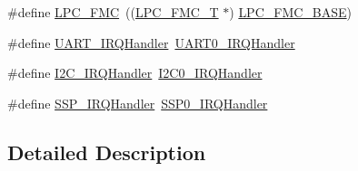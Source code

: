 \begin{DoxyCompactItemize}
\item 
\#define \hyperlink{group__PERIPH__175X__6X__BASE_ga406fa416fe50b196b86146ba0b20ba3c}{L\-P\-C\-\_\-\-F\-M\-C}~((\hyperlink{structLPC__FMC__T}{L\-P\-C\-\_\-\-F\-M\-C\-\_\-\-T}              $\ast$) \hyperlink{group__PERIPH__407X__8X__BASE_gaad6b7f57ab13bf5886da624bbb4bcc61}{L\-P\-C\-\_\-\-F\-M\-C\-\_\-\-B\-A\-S\-E})
\item 
\#define \hyperlink{group__PERIPH__175X__6X__BASE_gaf6a20f8c9320377f3713d96ea90bfd10}{U\-A\-R\-T\-\_\-\-I\-R\-Q\-Handler}~\hyperlink{lpc17__uartrb_8c_a1c0544b06d54b198d8c50f507e399a91}{U\-A\-R\-T0\-\_\-\-I\-R\-Q\-Handler}
\item 
\#define \hyperlink{group__PERIPH__175X__6X__BASE_ga78bc9c1986ea5da20688e1db532c5717}{I2\-C\-\_\-\-I\-R\-Q\-Handler}~\hyperlink{lpc17__i2c_8c_a8e817e99d2a59e5f48e4ff0c79e7eef5}{I2\-C0\-\_\-\-I\-R\-Q\-Handler}
\item 
\#define \hyperlink{group__PERIPH__175X__6X__BASE_gac4eb0fc5d2f19b89fa77194876b63df4}{S\-S\-P\-\_\-\-I\-R\-Q\-Handler}~\hyperlink{lpc17__ssp_8c_a56a77444d4b4985ba292102c14c94ed6}{S\-S\-P0\-\_\-\-I\-R\-Q\-Handler}
\end{DoxyCompactItemize}


\subsection{Detailed Description}


